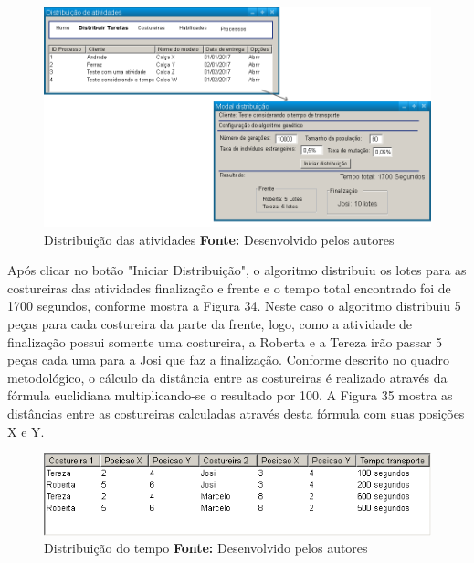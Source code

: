 \begin{figure}[h!]
	\centerline{\includegraphics[scale=0.3]{./imagens/test_case2_distribuicao.png}}
	\caption[Caso de teste tempo Costureira]
	{Distribuição das atividades \textbf{Fonte:} Desenvolvido pelos autores}
	\label{fig:exemplo1}
\end{figure}

\par Após clicar no botão "Iniciar Distribuição", o algoritmo distribuiu os lotes para as costureiras das atividades
 finalização e frente e o tempo total encontrado foi de 1700 segundos, conforme mostra a Figura 34. Neste caso o algoritmo 
 distribuiu 5 peças para cada costureira da parte da frente, logo, como a atividade de finalização possui somente uma costureira,
 a Roberta e a Tereza irão passar 5 peças cada uma para a Josi que faz a finalização. Conforme descrito no quadro metodológico, 
 o cálculo da distância entre as costureiras é realizado através da fórmula euclidiana multiplicando-se o resultado por 100.
 A Figura 35 mostra as distâncias entre as costureiras calculadas através desta fórmula com suas posições X e Y.
  
  \newpage
  
  \begin{figure}[h!]
  	\centerline{\includegraphics[scale=0.7]{./imagens/test_case_2_tempo_distribuicao.png}}
  	\caption[Caso de teste tempo Costureira]
  	{Distribuição do tempo  \textbf{Fonte:} Desenvolvido pelos autores}
  	\label{fig:exemplo1}
  \end{figure}
 
